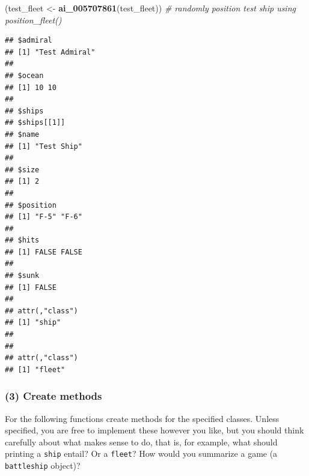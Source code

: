 \documentclass[
]{article}
\newenvironment{Shaded}{\begin{snugshade}}{\end{snugshade}}
\newcommand{\CommentTok}[1]{\textcolor[rgb]{0.56,0.35,0.01}{\textit{#1}}}
\newcommand{\FunctionTok}[1]{\textcolor[rgb]{0.13,0.29,0.53}{\textbf{#1}}}
\newcommand{\NormalTok}[1]{#1}
\newcommand{\OtherTok}[1]{\textcolor[rgb]{0.56,0.35,0.01}{#1}}
\begin{document}
\begin{Shaded}
\begin{Highlighting}[]
\NormalTok{(test\_fleet }\OtherTok{\textless{}{-}} \FunctionTok{ai\_005707861}\NormalTok{(test\_fleet)) }\CommentTok{\# randomly position test ship using position\_fleet()}
\end{Highlighting}
\end{Shaded}

\begin{verbatim}
## $admiral
## [1] "Test Admiral"
## 
## $ocean
## [1] 10 10
## 
## $ships
## $ships[[1]]
## $name
## [1] "Test Ship"
## 
## $size
## [1] 2
## 
## $position
## [1] "F-5" "F-6"
## 
## $hits
## [1] FALSE FALSE
## 
## $sunk
## [1] FALSE
## 
## attr(,"class")
## [1] "ship"
## 
## 
## attr(,"class")
## [1] "fleet"
\end{verbatim}

\subsubsection{(3) Create methods}\label{create-methods}

For the following functions create methods for the specified classes.
Unless specified, you are free to implement these however you like, but
you should think carefully about what makes sense to do, that is, for
example, what should printing a \texttt{ship} entail? Or a
\texttt{fleet}? How would you summarize a game (a \texttt{battleship}
object)?
\end{document}
